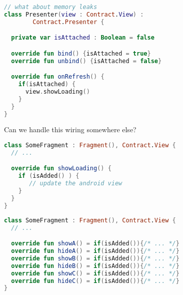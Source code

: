 \documentclass[10pt]{beamer}
\begin{document}
\begin{frame}[fragile]
\begin{lstlisting}[language=Kotlin, basicstyle=\ttfamily]
// what about memory leaks 
class Presenter(view : Contract.View) : 
        Contract.Presenter {

  private var isAttached : Boolean = false

  override fun bind() {isAttached = true}
  override fun unbind() {isAttached = false}

  override fun onRefresh() {
    if(isAttached) { 
      view.showLoading()
    }
  }
}
\end{lstlisting}
\end{frame}


\begin{frame}[fragile]
Can we handle this wiring somewhere else?
\end{frame}


\begin{frame}[fragile]
\begin{lstlisting}[language=Kotlin, basicstyle=\ttfamily]
class SomeFragment : Fragment(), Contract.View {
  // ...

  override fun showLoading() {
    if (isAdded() ) {
       // update the android view 
    }
  }
}
\end{lstlisting}
\end{frame}

\begin{frame}[fragile]
\begin{lstlisting}[language=Kotlin, basicstyle=\ttfamily]
class SomeFragment : Fragment(), Contract.View {
  // ...

  override fun showA() = if(isAdded()){/* ... */}
  override fun hideA() = if(isAdded()){/* ... */}
  override fun showB() = if(isAdded()){/* ... */}
  override fun hideB() = if(isAdded()){/* ... */}
  override fun showC() = if(isAdded()){/* ... */}
  override fun hideC() = if(isAdded()){/* ... */}
}
\end{lstlisting}
\end{frame}


\begin{frame}[fragile]
		\begin{figure}
			\centering
{}
		\end{figure}


\end{frame}
\end{document}
